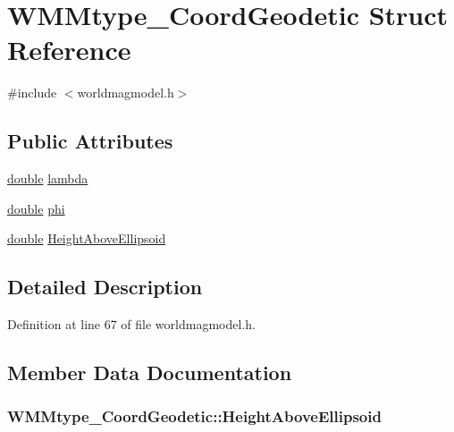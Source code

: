 \hypertarget{struct_w_m_mtype___coord_geodetic}{\section{W\-M\-Mtype\-\_\-\-Coord\-Geodetic Struct Reference}
\label{struct_w_m_mtype___coord_geodetic}
}


{\ttfamily \#include $<$worldmagmodel.\-h$>$}

\subsection*{Public Attributes}
\begin{DoxyCompactItemize}
\item 
\hyperlink{_super_l_u_support_8h_a8956b2b9f49bf918deed98379d159ca7}{double} \hyperlink{struct_w_m_mtype___coord_geodetic_ae94dc806d0564cca00a63db68e594225}{lambda}
\item 
\hyperlink{_super_l_u_support_8h_a8956b2b9f49bf918deed98379d159ca7}{double} \hyperlink{struct_w_m_mtype___coord_geodetic_afa72809b75b6c5675ffb657d6a85420a}{phi}
\item 
\hyperlink{_super_l_u_support_8h_a8956b2b9f49bf918deed98379d159ca7}{double} \hyperlink{struct_w_m_mtype___coord_geodetic_a58419b242080a524d51b52e49ff06e32}{Height\-Above\-Ellipsoid}
\end{DoxyCompactItemize}


\subsection{Detailed Description}


Definition at line 67 of file worldmagmodel.\-h.



\subsection{Member Data Documentation}
\hypertarget{struct_w_m_mtype___coord_geodetic_a58419b242080a524d51b52e49ff06e32}{
\subsubsection[{Height\-Above\-Ellipsoid}]{ W\-M\-Mtype\-\_\-\-Coord\-Geodetic\-::\-Height\-Above\-Ellipsoid}}\label{struct_w_m_mtype___coord_geodetic_a58419b242080a524d51b52e49ff06e32}


